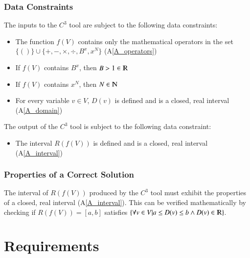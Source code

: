 \documentclass[12pt]{article}
\newcommand{\aref}[1]{A\ref{#1}}
\newcommand{\prognameAbbrv}{$C^{3}$}
\begin{document}


\subsubsection{Data Constraints} \label{sec_DataConstraints}  
The inputs to the \prognameAbbrv{} tool are subject to the following data 
constraints:

\begin{itemize}
	\item The function $f(V)$ contains only the mathematical operators in 
	the set $\{()\} \cup \{+, -, \times, \div, B^x, x^N \}$ (\aref{A_operators})
	\item If $f(V)$ contains $B^x$, then $B > 1 \in \varmathbb{R}$
	\item If $f(V)$ contains $x^N$, then $N \in \varmathbb{N}$
	\item For every variable $v \in V$, $D(v)$ is defined and is a closed, real 
	interval (\aref{A_domain})
\end{itemize}

\noindent
The output of the \prognameAbbrv{} tool is subject to the following data 
constraint:

\begin{itemize}
	\item The interval $R(f(V))$ is defined and is a closed, real interval 
	(\aref{A_interval})
\end{itemize}

\subsubsection{Properties of a Correct Solution} 
\label{sec_CorrectSolution}

\noindent
The interval of $R(f(V))$ produced by the \prognameAbbrv{} tool must exhibit 
the properties of a closed, real interval (\aref{A_interval}). This can be 
verified mathematically by checking if $R(f(V)) = [a,b]$ satisfies $\{\forall v 
\in V | a \leq D(v) \leq b \wedge D(v) \in \varmathbb{R}\}$.


\section{Requirements}
\label{requirements}
\end{document}
